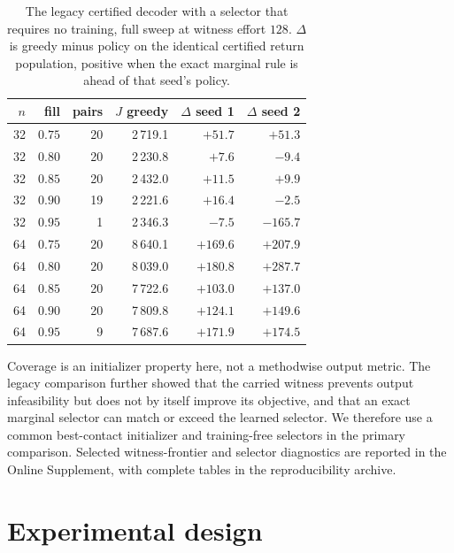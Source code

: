 \documentclass[preprint,12pt,authoryear]{elsarticle}
\begin{document}
\begin{table}[t]
\centering
\caption{The legacy certified decoder with a selector that requires no training, full sweep at
witness effort $128$. $\Delta$ is greedy minus policy on the identical
certified return population, positive when the exact marginal rule is ahead of
that seed's policy.}
\label{tab:certgreedy}
\small
\begin{tabular}{@{}rrrrrr@{}}
\toprule
$n$ & fill & pairs & $J$ greedy & $\Delta$ seed 1 & $\Delta$ seed 2 \\
\midrule
32 & $0.75$ & 20 & 2\,719.1 & $+51.7$ & $+51.3$ \\
32 & $0.80$ & 20 & 2\,230.8 & $+7.6$ & $-9.4$ \\
32 & $0.85$ & 20 & 2\,432.0 & $+11.5$ & $+9.9$ \\
32 & $0.90$ & 19 & 2\,221.6 & $+16.4$ & $-2.5$ \\
32 & $0.95$ &  1 & 2\,346.3 & $-7.5$ & $-165.7$ \\
\midrule
64 & $0.75$ & 20 & 8\,640.1 & $+169.6$ & $+207.9$ \\
64 & $0.80$ & 20 & 8\,039.0 & $+180.8$ & $+287.7$ \\
64 & $0.85$ & 20 & 7\,722.6 & $+103.0$ & $+137.0$ \\
64 & $0.90$ & 20 & 7\,809.8 & $+124.1$ & $+149.6$ \\
64 & $0.95$ &  9 & 7\,687.6 & $+171.9$ & $+174.5$ \\
\bottomrule
\end{tabular}
\end{table}

\fi

\fi

Coverage is an initializer property here, not a methodwise output metric. The
legacy comparison further showed that the carried witness prevents output
infeasibility but does not by itself improve its objective, and that an exact
marginal selector can match or exceed the learned selector. We therefore use a
common best-contact initializer and training-free selectors in the primary
comparison. Selected witness-frontier and selector diagnostics are reported in
the Online Supplement, with complete tables in the reproducibility archive.

\section{Experimental design}
\label{sec:protocol}
\end{document}
